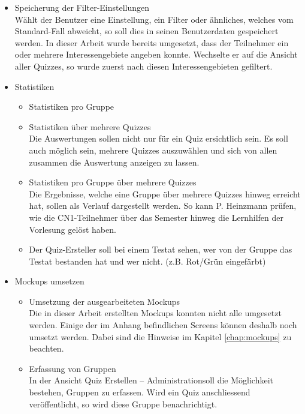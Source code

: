 \begin{itemize}
	\item Speicherung der Filter-Einstellungen \\
	Wählt der Benutzer eine Einstellung, ein Filter oder ähnliches, welches vom Standard-Fall abweicht, so soll dies in seinen Benutzerdaten gespeichert werden. In dieser Arbeit wurde bereits umgesetzt, dass der Teilnehmer ein oder mehrere Interessengebiete angeben konnte. Wechselte er auf die Ansicht aller Quizzes, so wurde zuerst nach diesen Interessengebieten gefiltert.
	
	
	\item Statistiken
	\begin{itemize}
		\item Statistiken pro Gruppe
		\item Statistiken über mehrere Quizzes \\
		Die Auswertungen sollen nicht nur für ein Quiz ersichtlich sein. Es soll auch möglich sein, mehrere Quizzes auszuwählen und sich von allen zusammen die Auswertung anzeigen zu lassen.
		\item Statistiken pro Gruppe über mehrere Quizzes \\
		Die Ergebnisse, welche eine Gruppe über mehrere Quizzes hinweg erreicht hat, sollen als Verlauf dargestellt werden. So kann P. Heinzmann prüfen, wie die CN1-Teilnehmer über das Semester hinweg die Lernhilfen der Vorlesung gelöst haben.
		\item Der Quiz-Ersteller soll bei einem Testat sehen, wer von der Gruppe das Testat bestanden hat und wer nicht. (z.B. Rot/Grün eingefärbt)
	\end{itemize}
	
	
	\item Mockups umsetzen \\
	\begin{itemize}
		\item Umsetzung der ausgearbeiteten Mockups\\
		Die in dieser Arbeit erstellten Mockups konnten nicht alle umgesetzt werden. Einige der im Anhang befindlichen Screens können deshalb noch umsetzt werden. Dabei sind die Hinweise im Kapitel \ref{chap:mockups} zu beachten.
		
		\item Erfassung von Gruppen \\
		In der Ansicht \glqq Quiz Erstellen – Administration\grqq soll die Möglichkeit bestehen, Gruppen zu erfassen. Wird ein Quiz anschliessend veröffentlicht, so wird diese Gruppe benachrichtigt.
		

\end{itemize}
\end{itemize}
